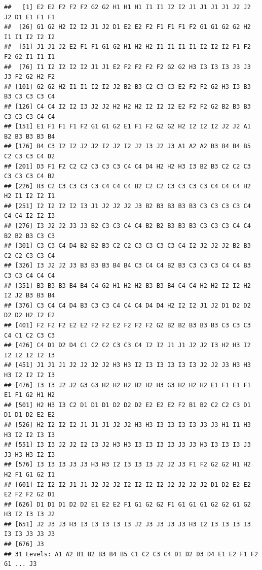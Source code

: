 \documentclass[
]{book}
\newenvironment{Shaded}{\begin{snugshade}}{\end{snugshade}}
\newcommand{\AttributeTok}[1]{\textcolor[rgb]{0.13,0.29,0.53}{#1}}
\newcommand{\ConstantTok}[1]{\textcolor[rgb]{0.56,0.35,0.01}{#1}}
\newcommand{\FunctionTok}[1]{\textcolor[rgb]{0.13,0.29,0.53}{\textbf{#1}}}
\newcommand{\NormalTok}[1]{#1}
\newcommand{\SpecialCharTok}[1]{\textcolor[rgb]{0.81,0.36,0.00}{\textbf{#1}}}
\newcommand{\StringTok}[1]{\textcolor[rgb]{0.31,0.60,0.02}{#1}}
\theoremstyle{break}
\theoremstyle{definition}
\theoremstyle{definition}
\theoremstyle{definition}
\theoremstyle{definition}
\theoremstyle{remark}
\begin{document}
\begin{verbatim}
##   [1] E2 E2 F2 F2 F2 G2 G2 H1 H1 H1 I1 I1 I2 I2 J1 J1 J1 J1 J2 J2 J2 D1 E1 F1 F1
##  [26] G1 G2 H2 I2 I2 J1 J2 D1 E2 E2 F2 F1 F1 F1 F2 G1 G1 G2 G2 H2 I1 I1 I2 I2 I2
##  [51] J1 J1 J2 E2 F1 F1 G1 G2 H1 H2 H2 I1 I1 I1 I1 I2 I2 I2 F1 F2 F2 G2 I1 I1 I1
##  [76] I1 I2 I2 I2 I2 J1 J1 E2 F2 F2 F2 F2 G2 G2 H3 I3 I3 I3 J3 J3 J3 F2 G2 H2 F2
## [101] G2 G2 H2 I1 I1 I2 I2 J2 B2 B3 C2 C3 C3 E2 F2 F2 G2 H3 I3 B3 B3 C3 C3 C3 C4
## [126] C4 C4 I2 I2 I3 J2 J2 H2 H2 H2 I2 I2 I2 E2 F2 F2 G2 B2 B3 B3 C3 C3 C3 C4 C4
## [151] E1 F1 F1 F1 F2 G1 G1 G2 E1 F1 F2 G2 G2 H2 I2 I2 I2 J2 J2 A1 B2 B3 B3 B3 B4
## [176] B4 C3 I2 I2 J2 J2 I2 J2 I2 J2 I3 J2 J3 A1 A2 A2 B3 B4 B4 B5 C2 C3 C3 C4 D2
## [201] D3 F1 F2 C2 C2 C3 C3 C3 C4 C4 D4 H2 H2 H3 I3 B2 B3 C2 C2 C3 C3 C3 C3 C4 B2
## [226] B3 C2 C3 C3 C3 C3 C4 C4 C4 B2 C2 C2 C3 C3 C3 C3 C4 C4 C4 H2 H2 I1 I2 I2 I1
## [251] I2 I2 I2 I2 I3 J1 J2 J2 J2 J3 B2 B3 B3 B3 B3 C3 C3 C3 C3 C4 C4 C4 I2 I2 I3
## [276] I3 J2 J2 J3 J3 B2 C3 C3 C4 C4 B2 B2 B3 B3 B3 C3 C3 C3 C4 C4 B2 B2 B3 C3 C3
## [301] C3 C3 C4 D4 B2 B2 B3 C2 C2 C3 C3 C3 C3 C4 I2 J2 J2 J2 B2 B3 C2 C2 C3 C3 C4
## [326] I3 J2 J2 J3 B3 B3 B3 B4 B4 C3 C4 C4 B2 B3 C3 C3 C3 C4 C4 B3 C3 C3 C4 C4 C4
## [351] B3 B3 B3 B4 B4 C4 G2 H1 H2 H2 B3 B3 B4 C4 C4 H2 H2 I2 I2 H2 I2 J2 B3 B3 B4
## [376] C3 C4 C4 D4 B3 C3 C3 C4 C4 C4 D4 D4 H2 I2 I2 J1 J2 D1 D2 D2 D2 D2 H2 I2 E2
## [401] F2 F2 F2 E2 E2 F2 F2 E2 F2 F2 F2 G2 B2 B2 B3 B3 B3 C3 C3 C3 C4 C1 C2 C3 C3
## [426] C4 D1 D2 D4 C1 C2 C2 C3 C3 C4 I2 I2 J1 J1 J2 J2 I3 H2 H3 I2 I2 I2 I2 I2 I3
## [451] J1 J1 J1 J2 J2 J2 J2 H3 H3 I2 I3 I3 I3 I3 I3 J2 J2 J3 H3 H3 H3 I2 I2 I2 I3
## [476] I3 I3 J2 J2 G3 G3 H2 H2 H2 H2 H2 H3 G3 H2 H2 H2 E1 F1 E1 F1 E1 F1 G2 H1 H2
## [501] H2 H3 I3 C2 D1 D1 D1 D2 D2 D2 E2 E2 E2 F2 B1 B2 C2 C2 C3 D1 D1 D1 D2 E2 E2
## [526] H2 I2 I2 I2 J1 J1 J1 J2 J2 H3 H3 I3 I3 I3 I3 J3 J3 H1 I1 H3 H3 I2 I2 I3 I3
## [551] I3 I3 J2 J2 I2 I3 J2 H3 H3 I3 I3 I3 I3 J3 J3 H3 I3 I3 I3 J3 J3 H3 H3 I2 I3
## [576] I3 I3 I3 J3 J3 H3 H3 I2 I3 I3 I3 J2 J2 J3 F1 F2 G2 G2 H1 H2 H2 F1 G1 G2 I1
## [601] I2 I2 I2 J1 J1 J2 J2 J2 I2 I2 I2 I2 J2 J2 J2 J2 D1 D2 E2 E2 E2 F2 F2 G2 D1
## [626] D1 D1 D1 D2 D2 E1 E2 E2 F1 G1 G2 G2 F1 G1 G1 G1 G2 G2 G1 G2 H3 I2 I3 I3 J2
## [651] J2 J3 J3 H3 I3 I3 I3 I3 I3 J2 J3 J3 J3 J3 H3 I2 I3 I3 I3 I3 I3 I3 J3 J3 J3
## [676] J3
## 31 Levels: A1 A2 B1 B2 B3 B4 B5 C1 C2 C3 C4 D1 D2 D3 D4 E1 E2 F1 F2 G1 ... J3
\end{verbatim}

\begin{Shaded}
\end{Shaded}
\end{document}
